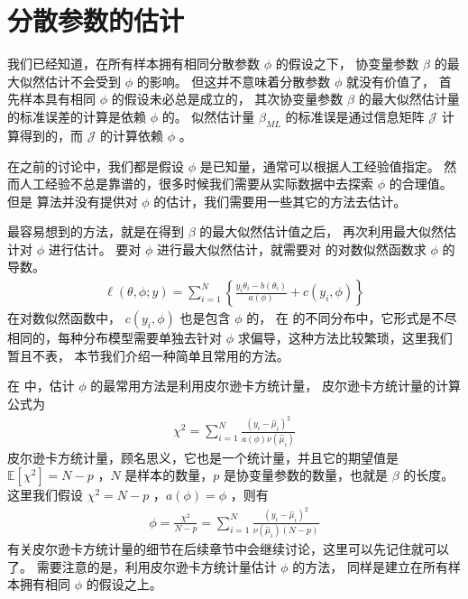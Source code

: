 \documentclass[letterpaper,10pt,english]{sphinxmanual}
\begin{document}
\section{分散参数的估计}
\label{\detokenize{_u5e7f_u4e49_u7ebf_u6027_u6a21_u578b/estimate:ch-glm-estimate-phi}}\label{\detokenize{_u5e7f_u4e49_u7ebf_u6027_u6a21_u578b/estimate:id13}}
我们已经知道，在所有样本拥有相同分散参数 \(\phi\) 的假设之下，
协变量参数 \(\beta\) 的最大似然估计不会受到 \(\phi\) 的影响。
但这并不意味着分散参数 \(\phi\) 就没有价值了，
首先样本具有相同 \(\phi\) 的假设未必总是成立的，
其次协变量参数 \(\beta\) 的最大似然估计量的标准误差的计算是依赖 \(\phi\) 的。
似然估计量 \(\hat{\beta}_{ML}\) 的标准误是通过信息矩阵 \(\mathcal{J}\)
计算得到的，而 \(\mathcal{J}\) 的计算依赖 \(\phi\) 。

在之前的讨论中，我们都是假设 \(\phi\) 是已知量，通常可以根据人工经验值指定。
然而人工经验不总是靠谱的，很多时候我们需要从实际数据中去探索 \(\phi\) 的合理值。
但是  算法并没有提供对 \(\phi\) 的估计，我们需要用一些其它的方法去估计。

最容易想到的方法，就是在得到 \(\beta\) 的最大似然估计值之后，
再次利用最大似然估计对 \(\phi\) 进行估计。
要对 \(\phi\) 进行最大似然估计，就需要对 
的对数似然函数求 \(\phi\) 的导数。
\begin{equation}\label{equation:广义线性模型/estimate:广义线性模型/estimate:49}
\begin{split}\ell(\theta,\phi;y)= \sum_{i=1}^N \left \{   \frac{y_i \theta_i - b(\theta_i)}{a(\phi)}   + c(y_i,\phi)   \right \}\end{split}
\end{equation}
在对数似然函数中， \(c(y_i,\phi)\) 也是包含 \(\phi\) 的，
在  的不同分布中，它形式是不尽相同的，每种分布模型需要单独去针对  \(\phi\)
求偏导，这种方法比较繁琐，这里我们暂且不表，
本节我们介绍一种简单且常用的方法。

在  中，估计 \(\phi\) 的最常用方法是利用皮尔逊卡方统计量，
皮尔逊卡方统计量的计算公式为
\begin{equation}\label{equation:广义线性模型/estimate:广义线性模型/estimate:50}
\begin{split}\chi^2 =  \sum_{i=1}^N \frac{(y_i-\hat{\mu}_i)^2}{a(\phi) \nu(\hat{\mu}_i)}\end{split}
\end{equation}
皮尔逊卡方统计量，顾名思义，它也是一个统计量，并且它的期望值是 \(\mathbb{E}[\chi^2]=N-p\)
，\(N\) 是样本的数量，\(p\) 是协变量参数的数量，也就是 \(\beta\) 的长度。
这里我们假设 \(\chi^2 = N-p\)
，\(a(\phi)=\phi\)
，则有
\begin{equation}\label{equation:广义线性模型/estimate:广义线性模型/estimate:51}
\begin{split}\phi = \frac{\chi^2}{N-p} = \sum_{i=1}^N \frac{(y_i-\hat{\mu}_i)^2}{\nu(\hat{\mu}_i) (N-p)}\end{split}
\end{equation}
有关皮尔逊卡方统计量的细节在后续章节中会继续讨论，这里可以先记住就可以了。
需要注意的是，利用皮尔逊卡方统计量估计 \(\phi\) 的方法，
同样是建立在所有样本拥有相同 \(\phi\) 的假设之上。
\end{document}
